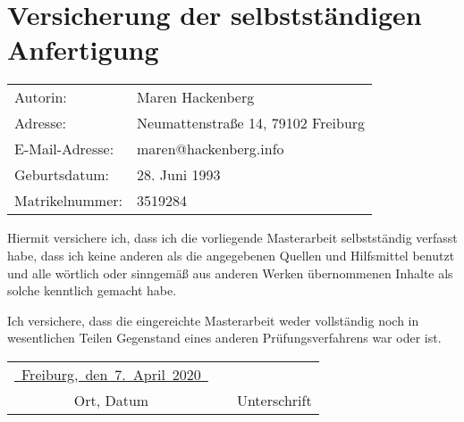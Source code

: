 \thispagestyle{empty}
\chapter*{Versicherung der selbstständigen Anfertigung}

\vspace*{1.5cm}

\begin{tabular}[]{ll}
	Autorin: &Maren Hackenberg\\
	Adresse: &Neumattenstraße 14, 79102 Freiburg\\
	E-Mail-Adresse: &maren@hackenberg.info\\
	Geburtsdatum: &28. Juni 1993\\
	Matrikelnummer: &3519284
\end{tabular}


\vspace{2cm}

Hiermit versichere ich, dass ich die vorliegende Masterarbeit selbstständig verfasst habe, dass ich keine anderen als die angegebenen Quellen und Hilfsmittel benutzt und alle wörtlich oder sinngemäß aus anderen Werken übernommenen Inhalte als solche kenntlich gemacht habe. 

Ich versichere, dass die eingereichte Masterarbeit weder vollständig noch in wesentlichen Teilen Gegenstand eines anderen Prüfungsverfahrens war oder ist.

\bigskip

\vspace{3.5cm}

\begin{center}
\begin{tabular}
[c]{ccc}
\underline{~Freiburg,~den~7.~April~2020~} & \hspace*{2.1cm} & \underline{\hspace*{4.7cm}}\\
         Ort, Datum               &                 &         Unterschrift
\end{tabular}
\end{center}

